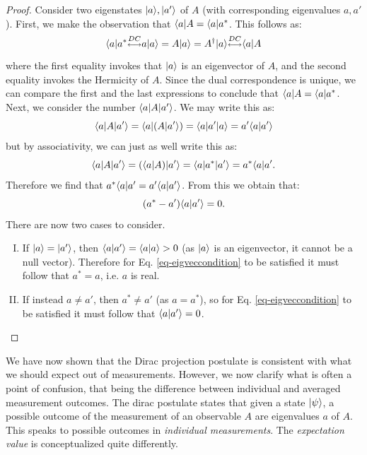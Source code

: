 \begin{proof}
    Consider two eigenstates $\lvert a \rangle, \lvert a' \rangle$ of $A$ (with corresponding eigenvalues $a, a'$). First, we make the observation that $\langle a \rvert A = \langle a \rvert a^*$. This follows as:
    \begin{equation}
        \bra{a}a^* \DC a\ket{a} = A\ket{a} = A^\dagger\ket{a} \DC \bra{a}A 
    \end{equation}
    where the first equality invokes that $\lvert a \rangle$ is an eigenvector of $A$, and the second equality invokes the Hermicity of $A$. Since the dual correspondence is unique, we can compare the first and the last expressions to conclude that $\langle a \rvert A = \langle a \rvert a^*$. Next, we consider the number $\langle a \rvert A\lvert a' \rangle$. We may write this as:
    \begin{equation}
        \langle a \rvert A\lvert a' \rangle = \langle a \rvert(A\lvert a' \rangle) = \langle a \rvert a'\lvert a \rangle = a'\langle a \lvert a' \rangle
    \end{equation} 
    but by associativity, we can just as well write this as:
    \begin{equation}
        \langle a \rvert A\lvert a' \rangle = (\langle a \rvert A)\lvert a' \rangle = \langle a \rvert a^*\lvert a' \rangle = a^*\langle a \rvert{a'}.
    \end{equation}
    Therefore we find that $a^*\langle a \rvert{a'} = a'\langle a \lvert a' \rangle$. From this we obtain that:
    \begin{equation}\label{eq-eigveccondition}
        (a^* - a')\langle a \lvert a' \rangle = 0.
    \end{equation}
    There are now two cases to consider.
    \begin{enumerate}[(I)]
        \item If $\lvert a \rangle = \lvert a' \rangle$, then $\langle a \lvert a' \rangle = \langle a \lvert a \rangle > 0$ (as $\lvert a \rangle$ is an eigenvector, it cannot be a null vector). Therefore for Eq. \eqref{eq-eigveccondition} to be satisfied it must follow that $a^* = a$, i.e. $a$ is real.
        \item If instead $a \neq a'$, then $a^* \neq a'$ (as $a = a^*$), so for Eq. \eqref{eq-eigveccondition} to be satisfied it must follow that $\langle a \lvert a' \rangle = 0$. 
    \end{enumerate}
\end{proof}

We have now shown that the Dirac projection postulate is consistent with what we should expect out of measurements. However, we now clarify what is often a point of confusion, that being the difference between individual and averaged measurement outcomes. The dirac postulate states that given a state $\lvert \psi \rangle$, a possible outcome of the measurement of an observable $A$ are eigenvalues $a$ of $A$. This speaks to possible outcomes in \emph{individual measurements}. The \emph{expectation value} is conceptualized quite differently.


